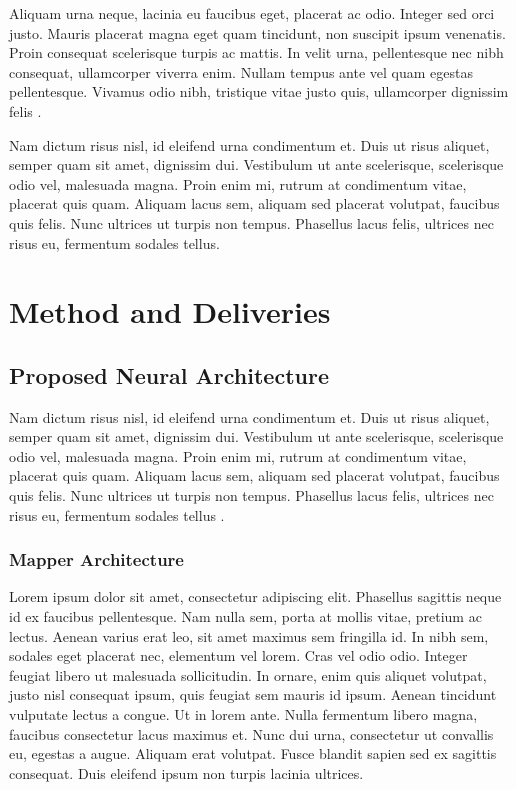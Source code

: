 \documentclass{two-col-epfl}
\begin{document}
Aliquam urna neque, lacinia eu faucibus eget, placerat ac odio. Integer sed orci justo. Mauris placerat magna eget quam tincidunt, non suscipit ipsum venenatis. Proin consequat scelerisque turpis ac mattis. In velit urna, pellentesque nec nibh consequat, ullamcorper viverra enim. Nullam tempus ante vel quam egestas pellentesque. Vivamus odio nibh, tristique vitae justo quis, ullamcorper dignissim felis \cite{chaplot2020object}.

Nam dictum risus nisl, id eleifend urna condimentum et. Duis ut risus aliquet, semper quam sit amet, dignissim dui. Vestibulum ut ante scelerisque, scelerisque odio vel, malesuada magna. Proin enim mi, rutrum at condimentum vitae, placerat quis quam. Aliquam lacus sem, aliquam sed placerat volutpat, faucibus quis felis. Nunc ultrices ut turpis non tempus. Phasellus lacus felis, ultrices nec risus eu, fermentum sodales tellus.

\section{Method and Deliveries}

\subsection{Proposed Neural Architecture}

Nam dictum risus nisl, id eleifend urna condimentum et. Duis ut risus aliquet, semper quam sit amet, dignissim dui. Vestibulum ut ante scelerisque, scelerisque odio vel, malesuada magna. Proin enim mi, rutrum at condimentum vitae, placerat quis quam. Aliquam lacus sem, aliquam sed placerat volutpat, faucibus quis felis. Nunc ultrices ut turpis non tempus. Phasellus lacus felis, ultrices nec risus eu, fermentum sodales tellus \cite{elfes1987sonar}.

\subsubsection{Mapper Architecture}


Lorem ipsum dolor sit amet, consectetur adipiscing elit. Phasellus sagittis neque id ex faucibus pellentesque. Nam nulla sem, porta at mollis vitae, pretium ac lectus. Aenean varius erat leo, sit amet maximus sem fringilla id. In nibh sem, sodales eget placerat nec, elementum vel lorem. Cras vel odio odio. Integer feugiat libero ut malesuada sollicitudin. In ornare, enim quis aliquet volutpat, justo nisl consequat ipsum, quis feugiat sem mauris id ipsum. Aenean tincidunt vulputate lectus a congue. Ut in lorem ante. Nulla fermentum libero magna, faucibus consectetur lacus maximus et. Nunc dui urna, consectetur ut convallis eu, egestas a augue. Aliquam erat volutpat. Fusce blandit sapien sed ex sagittis consequat. Duis eleifend ipsum non turpis lacinia ultrices.
\end{document}
